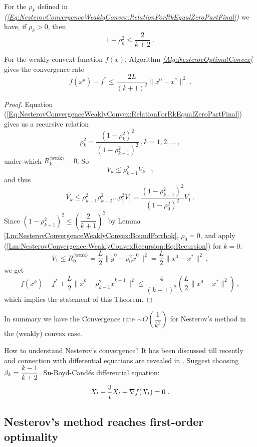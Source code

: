 \begin{lemma}\label{Lm:NesterovConvergenceWeaklyConvex:BoundForrhok}
For the $\rho_k$ defined in \emph{(\ref{Eq:NesterovConvergenceWeaklyConvex:RelationForRkEqualZeroPartFinal})} we have, if $\rho_k>0$, then
$$1-\rho_k^2 \le \frac{2}{k+2} \ .$$
\end{lemma}

\begin{theorem}\label{Thm:NesterovConvergence:WeaklyConvex} 
For the weakly convext function $f(x)$, Algorithm \emph{\ref{Alg:NesterovOptimalConvex}} gives the convergence rate $$f(x^k)-f^*\leq  \dfrac{2L}{(k+1)^2}\|x^0-x^*\|^2 \ .$$
\end{theorem}

\begin{proof}
Equation (\ref{Eq:NesterovConvergenceWeaklyConvex:RelationForRkEqualZeroPartFinal}) gives us a recursive relation $$\rho_k^2=\dfrac{(1-\rho_k^2)^2}{(1-\rho_{k-1}^2)^2} \ , k=1,2,... \ ,$$ 
under which
$R_k^{\text{(weak)}}=0$.
So 
$$V_k\leq \rho_{k-1}^2V_{k-1}$$ and thus 
$$V_k\leq \rho_{k-1}^2\rho_{k-2}^2...\rho_1^2V_1=\dfrac{(1-\rho_{k-1}^2)^2}{(1-\rho_0^2)^2}V_1 \ .$$
Since $(1-\rho_{k+1}^2)^2\leq \left(\dfrac{2}{k+1}\right)^2$ by Lemma \ref{Lm:NesterovConvergenceWeaklyConvex:BoundForrhok}, $\rho_0=0$, and apply (\ref{Lm:NesterovConvergence:WeaklyConvexRecursion:Eq:Recursion}) for $k=0$:
$$V_1\leq R_0^{\text{(weak)}} =\dfrac{L}{2}\|\tilde{y}^0-\rho_0^2\tilde{x}^0\|^2 = \dfrac{L}{2} \|x^0-x^*\|^2  \ ,$$
we get 
$$f(x^k)-f^*+\dfrac{L}{2}\|\tilde{x}^k-\rho_{k-1}^2\tilde{x}^{k-1}\|^2 \leq \dfrac{4}{(k+1)^2}
\left(
\dfrac{L}{2}
\|x^0-x^*\|^2
\right) \ ,$$
which implies the statement of this Theorem.
\end{proof}


In summary we have the Convergence rate $\sim O\!\left(\dfrac{1}{k^2}\right)$ for Nesterov's method in the (weakly) convex case.

How to understand Nesterov's convergence? It has been discussed till recently and connection with differential equations are revealed in \cite{SuBoydCandes2013JMLR}. 
Suggest choosing $\beta_k=\dfrac{k-1}{k+2}$.
Su-Boyd-Cand\'{e}s differential equation: $$\ddot{X}_t+\dfrac{3}{t}\dot{X}_t+\grad f(X_t)=0 \ .$$

\subsection{Nesterov's method reaches first-order optimality}

